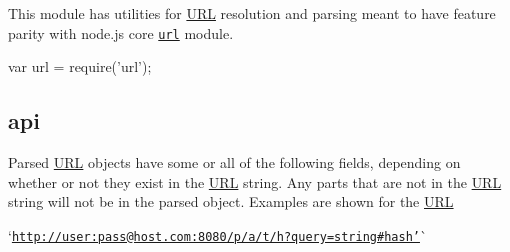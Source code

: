 \href{https://travis-ci.org/defunctzombie/node-url}{\tt }

This module has utilities for \mbox{\hyperlink{namespace_u_r_l}{U\+RL}} resolution and parsing meant to have feature parity with node.\+js core \href{http://nodejs.org/api/url.html}{\tt url} module.


\begin{DoxyCode}
var url = require('url');
\end{DoxyCode}


\subsection*{api}

Parsed \mbox{\hyperlink{namespace_u_r_l}{U\+RL}} objects have some or all of the following fields, depending on whether or not they exist in the \mbox{\hyperlink{namespace_u_r_l}{U\+RL}} string. Any parts that are not in the \mbox{\hyperlink{namespace_u_r_l}{U\+RL}} string will not be in the parsed object. Examples are shown for the \mbox{\hyperlink{namespace_u_r_l}{U\+RL}}

`\textquotesingle{}\href{http://user:pass@host.com:8080/p/a/t/h?query=string#hash&rsquo;}{\tt http\+://user\+:pass@host.\+com\+:8080/p/a/t/h?query=string\#hash'}\`{}


